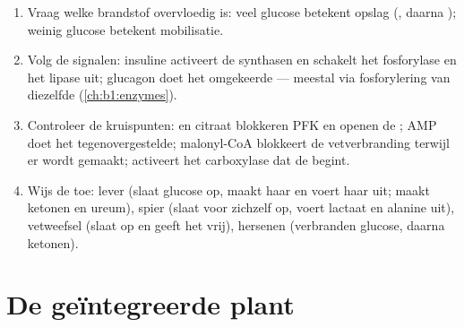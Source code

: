 \begin{method}\label{met:b1:biosyntheses-integration:state}
\begin{enumerate}
  \item Vraag welke brandstof overvloedig is: veel glucose betekent opslag
        (, daarna ); weinig glucose betekent mobilisatie.
  \item Volg de signalen: insuline activeert de synthasen en schakelt het
        fosforylase en het lipase uit; glucagon doet het omgekeerde ---
        meestal via fosforylering van diezelfde 
        (\cref{ch:b1:enzymes}).
  \item Controleer de kruispunten:  en citraat blokkeren PFK en openen
        de ; AMP doet het tegenovergestelde; malonyl-CoA
        blokkeert de vetverbranding terwijl er  wordt gemaakt;
         activeert het carboxylase dat de 
        begint.
  \item Wijs de  toe: lever (slaat glucose op, maakt haar en voert
        haar uit; maakt ketonen en ureum), spier (slaat  voor
        zichzelf op, voert lactaat en alanine uit), vetweefsel (slaat 
        op en geeft het vrij), hersenen (verbranden glucose, daarna
        ketonen).
\end{enumerate}
\end{method}

\section{De geïntegreerde plant}

